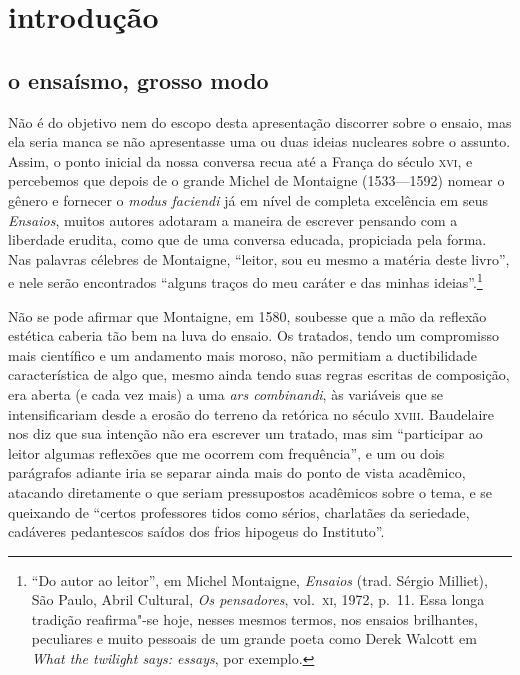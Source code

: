\chapter[Introdução, por Dirceu Villa]{introdução}

\section{o ensaísmo, grosso modo}

Não é do objetivo nem do escopo desta apresentação discorrer sobre o
ensaio, mas ela seria manca se não apresentasse uma ou duas ideias
nucleares sobre o assunto. Assim, o ponto inicial da nossa conversa
recua até a França do século \textsc{xvi}, e percebemos que depois de o grande	
Michel de Montaigne (1533---1592) nomear o gênero e fornecer o
\textit{modus faciendi} já em nível de completa excelência em seus
\textit{Ensaios}, muitos autores adotaram a maneira de escrever
pensando com a liberdade erudita, como que de uma conversa educada,
propiciada pela forma. Nas palavras célebres de Montaigne, “leitor, sou
eu mesmo a matéria deste livro”, e nele serão encontrados “alguns
traços do meu caráter e das minhas ideias”.\footnote{ “Do autor ao
leitor”, em Michel Montaigne, \textit{Ensaios} (trad.
Sérgio Milliet), São Paulo, Abril Cultural, \textit{Os
pensadores}, vol.~\textsc{xi}, 1972, p.~11. Essa longa tradição 
reafirma"-se hoje,
nesses mesmos termos, nos ensaios brilhantes, peculiares e muito
pessoais de um grande poeta como Derek Walcott em \textit{What the 
twilight says: essays}, por exemplo.}

Não se pode afirmar que Montaigne, em 1580, soubesse que a mão da
reflexão estética caberia tão bem na luva do ensaio. Os tratados, tendo
um compromisso mais científico e um andamento mais moroso, não
permitiam a ductibilidade característica de algo que, mesmo ainda tendo
suas regras escritas de composição, era aberta (e cada vez mais) a uma
\textit{ars combinandi}, às variáveis que se intensificariam desde a
erosão do terreno da retórica no século \textsc{xviii}. Baudelaire nos diz que
sua intenção não era escrever um tratado, mas sim “participar ao leitor
algumas reflexões que me ocorrem com frequência”, e um ou dois
parágrafos adiante iria se separar ainda mais do ponto de vista
acadêmico, atacando diretamente o que seriam pressupostos acadêmicos
sobre o tema, e se queixando de “certos professores tidos como sérios,
charlatães da seriedade, cadáveres pedantescos saídos dos frios
hipogeus do Instituto”.


